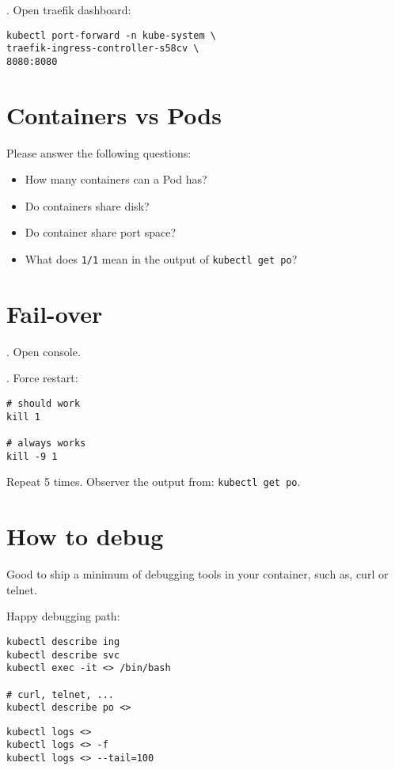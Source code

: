 \documentclass[12pt, letterpaper]{article}
\begin{document}
. Open traefik dashboard:

\begin{verbatim}
kubectl port-forward -n kube-system \
traefik-ingress-controller-s58cv \
8080:8080
\end{verbatim}

\section{Containers vs Pods}
Please answer the following questions:
\begin{itemize}
\item How many containers can a Pod has?
\item Do containers share disk?
\item Do container share port space?
\item What does \verb|1/1| mean in the output of \verb|kubectl get po|?
\end{itemize}

\bigskip
\bigskip

\section{Fail-over}

. Open console.

. Force restart:

\begin{verbatim}
# should work
kill 1

# always works
kill -9 1
\end{verbatim}

Repeat 5 times. Observer the output from: \verb|kubectl get po|.

%
%
%
\section{How to debug}

Good to ship a minimum of debugging tools in your container, such as, curl or telnet.

Happy debugging path:

\begin{verbatim}
kubectl describe ing
kubectl describe svc
kubectl exec -it <> /bin/bash

# curl, telnet, ...
kubectl describe po <>
\end{verbatim}

\begin{verbatim}
kubectl logs <>
kubectl logs <> -f
kubectl logs <> --tail=100
\end{verbatim}
\end{document}
